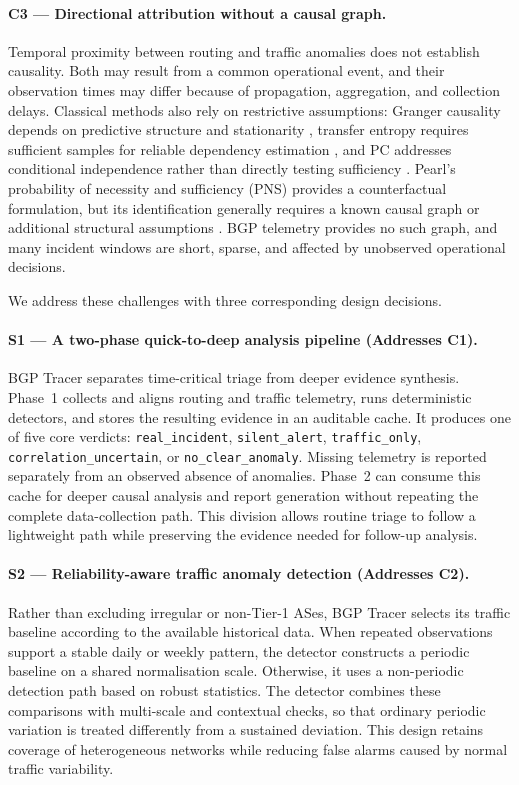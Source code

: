 \paragraph{C3 --- Directional attribution without a causal graph.}
Temporal proximity between routing and traffic anomalies does not
establish causality. Both may result from a common operational event,
and their observation times may differ because of propagation,
aggregation, and collection delays. Classical methods also rely on
restrictive assumptions: Granger causality depends on predictive
structure and stationarity \cite{granger-1969}, transfer entropy
requires sufficient samples for reliable dependency estimation
\cite{schreiber-2000-te}, and PC addresses conditional independence
rather than directly testing sufficiency \cite{spirtes-cps-2000}.
Pearl's probability of necessity and sufficiency (PNS) provides a
counterfactual formulation, but its identification generally requires
a known causal graph or additional structural assumptions
\cite{pearl-causality-2009,tian-pearl-2000}. BGP telemetry provides no
such graph, and many incident windows are short, sparse, and affected
by unobserved operational decisions.

We address these challenges with three corresponding design
decisions.

\paragraph{S1 --- A two-phase quick-to-deep analysis pipeline
(Addresses C1).}
BGP Tracer separates time-critical triage from deeper evidence
synthesis. Phase~1 collects and aligns routing and traffic telemetry,
runs deterministic detectors, and stores the resulting evidence in an
auditable cache. It produces one of five core verdicts:
\texttt{real\_incident}\allowbreak, \texttt{silent\_alert}\allowbreak,
\texttt{traffic\_only}\allowbreak, \texttt{correlation\_uncertain}\allowbreak,
or \texttt{no\_clear\_anomaly}.
Missing telemetry is reported separately
from an observed absence of anomalies. Phase~2 can consume this cache
for deeper causal analysis and report generation without repeating
the complete data-collection path. This division allows routine
triage to follow a lightweight path while preserving the evidence
needed for follow-up analysis.

\paragraph{S2 --- Reliability-aware traffic anomaly detection
(Addresses C2).}
Rather than excluding irregular or non-Tier-1 ASes, BGP Tracer selects
its traffic baseline according to the available historical data.
When repeated observations support a stable daily or weekly pattern,
the detector constructs a periodic baseline on a shared normalisation
scale. Otherwise, it uses a non-periodic detection path based on
robust statistics. The detector combines these comparisons with
multi-scale and contextual checks, so that ordinary periodic variation
is treated differently from a sustained deviation. This design retains
coverage of heterogeneous networks while reducing false alarms caused
by normal traffic variability.

